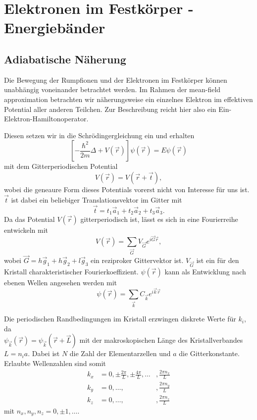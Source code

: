 \setcounter{section}{7}

\section{Elektronen im Festkörper - Energiebänder}
\subsection{Adiabatische Näherung}
Die Bewegung der Rumpfionen und der Elektronen im Festkörper können unabhängig voneinander betrachtet werden. 
Im Rahmen der mean-field approximation betrachten wir näherungsweise ein einzelnes Elektron im effektiven Potential aller anderen Teilchen.
Zur Beschreibung reicht hier also ein Ein-Elektron-Hamiltonoperator.

Diesen setzen wir in die Schrödingergleichung ein und erhalten
\begin{equation}
	\label{eq:II.8.2}
	\left[ - \frac{\hbar^2}{2m} \Delta + V(\Vec{r}) \right] \psi(\Vec{r}) = E \psi(\Vec{r})
\end{equation}
mit dem Gitterperiodischen Potential
\begin{equation}
	\label{eq:II.8.3}
	V(\Vec{r}) = V(\Vec{r} + \Vec{t}),
\end{equation}
wobei die geneaure Form dieses Potentials vorerst nicht von Interesse für uns ist. $\vec t$ ist dabei ein beliebiger Translationsvektor im Gitter mit
$$
\vec t = t_1 \Vec{a}_{1} + t_2 \Vec{a}_{2} + t_3 \Vec{a}_{3}.
$$ 
Da das Potential $V(\Vec{r})$ gitterperiodisch ist, lässt es sich in eine Fourierreihe entwickeln mit
\begin{equation}
	\label{eq:II.8.4}
	V(\Vec{r}) = \sum_{\Vec{G}}^{} V_{\Vec{G}} e^{i \Vec{G} \Vec{r}},
\end{equation}
wobei $\Vec{G} = h\Vec{g}_{1} + h\Vec{g}_{2} + l\Vec{g}_{3}$ ein reziproker Gittervektor ist. 
$V_{\Vec{G}}$ ist ein für den Kristall charakteristischer Fourierkoeffizient.
 $\psi(\Vec{r})$ kann als Entwicklung nach ebenen Wellen angesehen werden mit
\begin{equation}
	\label{eq:II.8.5}
	\psi(\Vec{r}) = \sum_{\Vec{k} }^{} C_{\vec k} e^{i \Vec{k} \Vec{r}} 
\end{equation}

Die periodischen Randbedingungen im Kristall erzwingen diskrete Werte für $k_{i}$, da \\${\psi_{\Vec{k}}(\Vec{r}) = \psi_{\Vec{k}}(\Vec{r} + \Vec{L})}$ mit der makroskopischen Länge des Kristallverbandes $L = n_{i} a$. 
Dabei ist $N$ die Zahl der Elementarzellen und $a$ die Gitterkonstante.
Erlaubte Wellenzahlen sind somit
$$
\begin{aligned}
	k_{x} &= 0, \pm \frac{2\pi}{L}, \pm \frac{4\pi}{L}, \ldots&, \frac{2\pi n_{x}}{L} \\
	k_{y} &= 0,\ldots, &, \frac{2\pi n_{y}}{L} \\
	k_{z} &= 0, \ldots, &, \frac{2\pi n_{z}}{L}
\end{aligned}
$$ 
mit $n_{x}, n_{y}, n_{z} = 0, \pm 1, \ldots$. 

